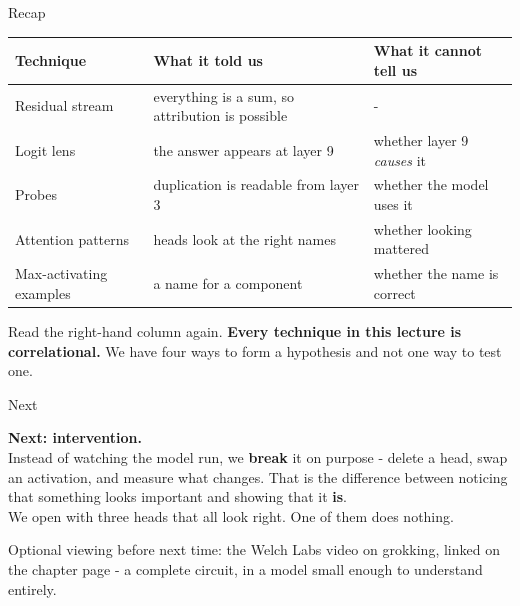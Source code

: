 \documentclass[aspectratio=169]{beamer}
\newcommand{\trapbox}[1]{%
  \begin{tcolorbox}[colback=armred!8, colframe=armred, boxrule=0.6pt, arc=2pt]
  #1
  \end{tcolorbox}}
\newcommand{\takebox}[1]{%
  \begin{tcolorbox}[colback=paramgreen!8, colframe=paramgreen, boxrule=0.6pt, arc=2pt]
  #1
  \end{tcolorbox}}
\begin{document}
\begin{frame}{Recap}
  \vspace{0.4em}
  \begin{center}
  \small
  \begin{tabular}{@{}p{}p{}p{}@{}}
    \toprule
    \textbf{Technique} & \textbf{What it told us} & \textbf{What it cannot tell us}\\
    \midrule
    Residual stream & everything is a sum, so attribution is possible & -\\[0.4em]
    Logit lens & the answer appears at layer 9 & whether layer 9 \emph{causes} it\\[0.4em]
    Probes & duplication is readable from layer 3 & whether the model uses it\\[0.4em]
    Attention patterns & heads look at the right names & whether looking mattered\\[0.4em]
    Max-activating examples & a name for a component & whether the name is correct\\
    \bottomrule
  \end{tabular}
  \end{center}

  \vspace{0.7em}
  \trapbox{Read the right-hand column again. \textbf{Every technique in this lecture is
  correlational.} We have four ways to form a hypothesis and not one way to test one.}
\end{frame}

\begin{frame}{Next}
  \vspace{1.2em}
  \takebox{\textbf{Next: intervention.}\\[0.6em]
  Instead of watching the model run, we \textbf{break} it on purpose - delete a head, swap an
  activation, and measure what changes. That is the difference between noticing that something
  looks important and showing that it \textbf{is}.\\[0.8em]
  We open with three heads that all look right. One of them does nothing.}

  \vspace{1.2em}
  \begin{center}
    {\footnotesize Optional viewing before next time: the Welch Labs video on grokking, linked on
    the chapter page - a complete circuit, in a model small enough to understand entirely.}
  \end{center}
\end{frame}
\end{document}

